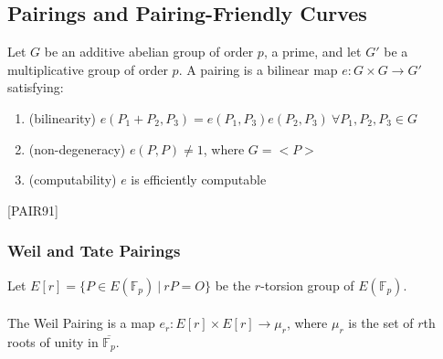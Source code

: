\documentclass[12pt,twoside]{article}
\newcommand\given[1][]{\:#1\vert\:}
\begin{document}

\subsection{Pairings and Pairing-Friendly Curves}
Let $G$ be an additive abelian group of order $p$, a prime, and let $G'$ be a multiplicative group of order $p$. A pairing is a bilinear map $e: G \times G \to G'$ satisfying:
\begin{enumerate}
\item (bilinearity) $e(P_1 + P_2, P_3) = e(P_1,P_3)e(P_2,P_3) \ \forall P_1,P_2,P_3 \in G$
\item (non-degeneracy) $e(P,P) \ne 1$, where $G = \mathopen{<} P \mathopen{>}$
\item (computability) $e$ is efficiently computable
\end{enumerate} [PAIR91]
\subsubsection{Weil and Tate Pairings}
Let $E[r] = \{ P \in E(\mathbb F_p) \given rP = O\}$ be the $r$-torsion group of $E(\mathbb F_p)$.
\\ \\
\noindent The Weil Pairing is a map $e_r: E[r] \times E[r] \to \mu_r$, where $\mu_{r}$ is the set of $r$th roots of unity in $\overline{\mathbb F_p}$. \\ 
\end{document}

